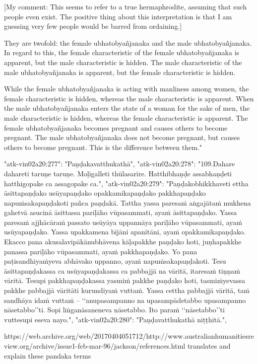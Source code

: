 [My comment: This seems to refer to a true hermaphrodite, assuming that such people even exist. The positive thing about this interpretation is that I am guessing very few people would be barred from ordaining.] 

They are twofold: the female ubhatobyañjanaka and the male ubhatobyañjanaka. In regard to this, the female characteristic of the female ubhatobyañjanaka is apparent, but the male characteristic is hidden. The male characteristic of the male ubhatobyañjanaka is apparent, but the female characteristic is hidden. 

While the female ubhatobyañjanaka is acting with manliness among women, the female characteristic is hidden, whereas the male characteristic is apparent. 
When the male ubhatobyañjanaka enters the state of a woman for the sake of men, the male characteristic is hidden, whereas the female characteristic is apparent. 
The female ubhatobyañjanaka becomes pregnant and causes others to become pregnant. The male ubhatobyañjanaka does not become pregnant, but causes others to become pregnant. This is the difference between them."



  "atk-vin02a20:277": "Paṇḍakavatthukathā",
  "atk-vin02a20:278": "109.Dahare dahareti taruṇe taruṇe. Moḷigalleti thūlasarīre. Hatthibhaṇḍe assabhaṇḍeti hatthigopake ca assagopake ca.",
  "atk-vin02a20:279": "Paṇḍakobhikkhaveti ettha āsittapaṇḍako usūyapaṇḍako opakkamikapaṇḍako pakkhapaṇḍako napuṁsakapaṇḍakoti pañca paṇḍakā. Tattha yassa paresaṁ aṅgajātaṁ mukhena gahetvā asucinā āsittassa pariḷāho vūpasammati, ayaṁ āsittapaṇḍako. Yassa paresaṁ ajjhācāraṁ passato usūyāya uppannāya pariḷāho vūpasammati, ayaṁ usūyapaṇḍako. Yassa upakkamena bījāni apanītāni, ayaṁ opakkamikapaṇḍako. Ekacco pana akusalavipākānubhāvena kāḷapakkhe paṇḍako hoti, juṇhapakkhe panassa pariḷāho vūpasammati, ayaṁ pakkhapaṇḍako. Yo pana paṭisandhiyaṁyeva abhāvako uppanno, ayaṁ napuṁsakapaṇḍakoti. Tesu āsittapaṇḍakassa ca usūyapaṇḍakassa ca pabbajjā na vāritā, itaresaṁ tiṇṇaṁ vāritā. Tesupi pakkhapaṇḍakassa yasmiṁ pakkhe paṇḍako hoti, tasmiṁyevassa pakkhe pabbajjā vāritāti kurundiyaṁ vuttaṁ. Yassa cettha pabbajjā vāritā, taṁ sandhāya idaṁ vuttaṁ – ‘‘anupasampanno na upasampādetabbo upasampanno nāsetabbo’’ti. Sopi liṅganāsaneneva nāsetabbo. Ito paraṁ ‘‘nāsetabbo’’ti vuttesupi eseva nayo.",
  "atk-vin02a20:280": "Paṇḍavatthukathā niṭṭhitā.",

  https://web.archive.org/web/20170404051712/http://www.australianhumanitiesreview.org/archive/issue1-feb-mar-96/jackson/references.html translates and explain these pandaka terms